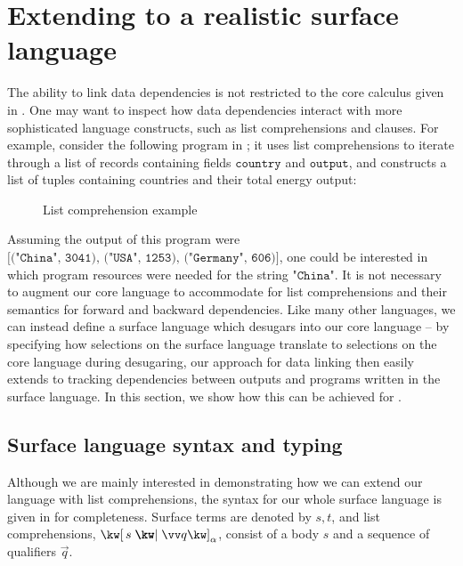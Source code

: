 \section{Extending to a realistic surface language}
\label{sec:surface-language}

The ability to link data dependencies is not restricted to the core calculus given in . One may want to inspect how data dependencies interact with more sophisticated language constructs, such as list comprehensions and clauses. For example, consider the following program in ; it uses list comprehensions to iterate through a list of records containing fields $\texttt{country}$ and $\texttt{output}$, and constructs a list of tuples containing countries and their total energy output:

\begin{figure}[H]
   \small
   
   \caption{List comprehension example}
   \label{fig:surface-language:example}
\end{figure}

\noindent
Assuming the output of this program were $\texttt{[("China", 3041), ("USA", 1253), ("Germany", 606)]}$, one could be interested in which program resources were needed for the string $\texttt{"China"}$. It is not necessary to augment our core language to accommodate for list comprehensions and their semantics for forward and backward dependencies. Like many other languages, we can instead define a surface language which desugars into our core language -- by specifying how selections on the surface language translate to selections on the core language during desugaring, our approach for data linking then easily extends to tracking dependencies between outputs and programs written in the surface language. In this section, we show how this can be achieved for .

\subsection{Surface language syntax and typing}

Although we are mainly interested in demonstrating how we can extend our language with list comprehensions, the syntax for our whole surface language is given in  for completeness. Surface terms are denoted by $s, t$, and list comprehensions, $\annListComp{s}{\vec{q}}{\alpha}$, consist of a body $s$ and a sequence of qualifiers $\vec{q}$.

